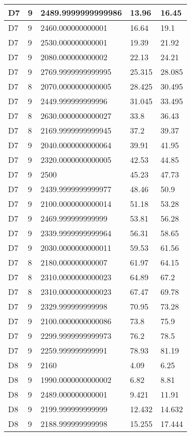 \begin{longtable}{|l|l|l|l|l|}
D7 & 9 & 2489.9999999999986 & 13.96 & 16.45 \\ \hline
D7 & 9 & 2460.000000000001 & 16.64 & 19.1 \\ \hline
D7 & 9 & 2530.000000000001 & 19.39 & 21.92 \\ \hline
D7 & 9 & 2080.000000000002 & 22.13 & 24.21 \\ \hline
D7 & 9 & 2769.9999999999995 & 25.315 & 28.085 \\ \hline
D7 & 8 & 2070.0000000000005 & 28.425 & 30.495 \\ \hline
D7 & 9 & 2449.999999999996 & 31.045 & 33.495 \\ \hline
D7 & 8 & 2630.0000000000027 & 33.8 & 36.43 \\ \hline
D7 & 8 & 2169.9999999999945 & 37.2 & 39.37 \\ \hline
D7 & 9 & 2040.0000000000064 & 39.91 & 41.95 \\ \hline
D7 & 9 & 2320.0000000000005 & 42.53 & 44.85 \\ \hline
D7 & 9 & 2500 & 45.23 & 47.73 \\ \hline
D7 & 9 & 2439.9999999999977 & 48.46 & 50.9 \\ \hline
D7 & 9 & 2100.0000000000014 & 51.18 & 53.28 \\ \hline
D7 & 9 & 2469.999999999999 & 53.81 & 56.28 \\ \hline
D7 & 9 & 2339.9999999999964 & 56.31 & 58.65 \\ \hline
D7 & 9 & 2030.0000000000011 & 59.53 & 61.56 \\ \hline
D7 & 8 & 2180.000000000007 & 61.97 & 64.15 \\ \hline
D7 & 8 & 2310.0000000000023 & 64.89 & 67.2 \\ \hline
D7 & 8 & 2310.0000000000023 & 67.47 & 69.78 \\ \hline
D7 & 9 & 2329.999999999998 & 70.95 & 73.28 \\ \hline
D7 & 9 & 2100.0000000000086 & 73.8 & 75.9 \\ \hline
D7 & 9 & 2299.9999999999973 & 76.2 & 78.5 \\ \hline
D7 & 9 & 2259.999999999991 & 78.93 & 81.19 \\ \hline
D8 & 9 & 2160 & 4.09 & 6.25 \\ \hline
D8 & 9 & 1990.0000000000002 & 6.82 & 8.81 \\ \hline
D8 & 9 & 2489.000000000001 & 9.421 & 11.91 \\ \hline
D8 & 9 & 2199.999999999999 & 12.432 & 14.632 \\ \hline
D8 & 9 & 2188.999999999998 & 15.255 & 17.444 \\ \hline

\end{longtable}
